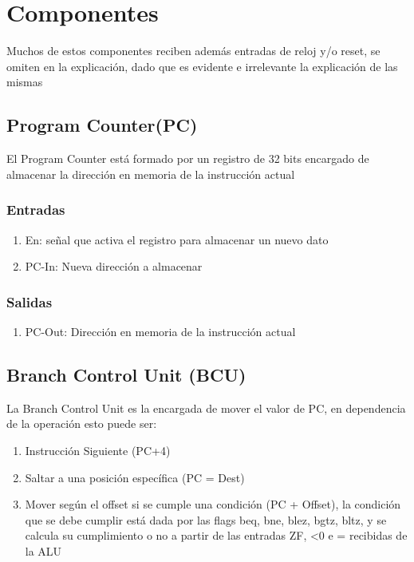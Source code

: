 \documentclass{article}
\begin{document}
    \section{Componentes}
        
        Muchos de estos componentes reciben adem\'as entradas de reloj y/o reset, se omiten en la explicaci\'on, dado que es evidente e irrelevante la explicaci\'on de las mismas
    
        \subsection{Program Counter(PC)}
        \label{sec:PC}
        El Program Counter est\'a formado por un registro de 32 bits encargado de almacenar la direcci\'on en memoria de la instrucci\'on actual

        \subsubsection{Entradas}
        \begin{enumerate}
            \item En: se\~nal que activa el registro para almacenar un nuevo dato
            \item PC-In: Nueva direcci\'on a almacenar 
        \end{enumerate}
        \subsubsection{Salidas}
        \begin{enumerate}
            \item PC-Out: Direcci\'on en memoria de la instrucci\'on actual
        \end{enumerate}

        \subsection{Branch Control Unit (BCU)}
        \label{sec:BCU}
        La Branch Control Unit es la encargada de mover el valor de PC, en dependencia de la operaci\'on esto puede ser:
        \begin{enumerate}
            \item Instrucci\'on Siguiente (PC+4)
            \item Saltar a una posici\'on espec\'ifica (PC = Dest)
            \item Mover seg\'un el offset si se cumple una condici\'on (PC + Offset), la condici\'on que se debe cumplir est\'a dada por las flags beq, bne, blez, bgtz, bltz, y se calcula su cumplimiento o no a partir de las entradas ZF, <0 e = recibidas de la ALU
        \end{enumerate}
\end{document}
